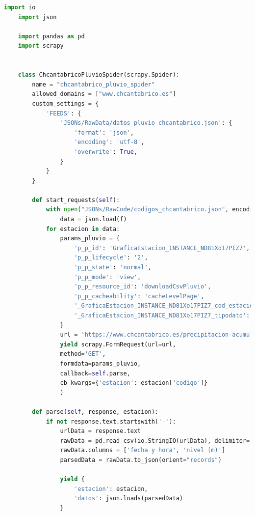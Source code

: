 \begin{lstlisting}[language=Python, caption={Chcantabrico Pluviometric Spider}]
	import io
	import json
	
	import pandas as pd
	import scrapy
	
	
	class ChcantabricoPluvioSpider(scrapy.Spider):
		name = "chcantabrico_pluvio_spider"
		allowed_domains = ["www.chcantabrico.es"]
		custom_settings = {
			'FEEDS': {
				'JSONs/RawData/datos_pluvio_chcantabrico.json': {
					'format': 'json',
					'encoding': 'utf-8',
					'overwrite': True,
				}
			}
		}
	
		def start_requests(self):
			with open("JSONs/RawCode/codigos_chcantabrico.json", encoding="utf-8") as f:
				data = json.load(f)
			for estacion in data:
				params_pluvio = {
					'p_p_id': 'GraficaEstacion_INSTANCE_ND81Xo17PIZ7',
					'p_p_lifecycle': '2',
					'p_p_state': 'normal',
					'p_p_mode': 'view',
					'p_p_resource_id': 'downloadCsvPluvio',
					'p_p_cacheability': 'cacheLevelPage',
					'_GraficaEstacion_INSTANCE_ND81Xo17PIZ7_cod_estacion': f'{estacion["codigo"]}',
					'_GraficaEstacion_INSTANCE_ND81Xo17PIZ7_tipodato': 'pluvio',
				}
				url = 'https://www.chcantabrico.es/precipitacion-acumulada'
				yield scrapy.FormRequest(url=url,
				method='GET',
				formdata=params_pluvio,
				callback=self.parse,
				cb_kwargs={'estacion': estacion['codigo']}
				)
		
		def parse(self, response, estacion):
			if not response.text.startswith('-'):
				urlData = response.text
				rawData = pd.read_csv(io.StringIO(urlData), delimiter=';', encoding='utf-8', header=1)
				rawData.columns = ['fecha y hora', 'nivel (m)']
				parsedData = rawData.to_json(orient="records")
				
				yield {
					'estacion': estacion,
					'datos': json.loads(parsedData)
				}
\end{lstlisting}

